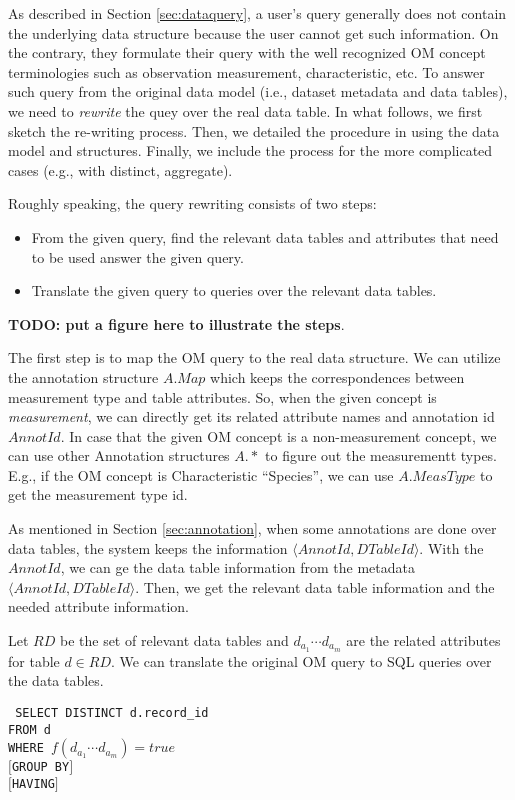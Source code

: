 \documentclass[conference]{IEEEtran}
\begin{document}
As described in Section \ref{sec:dataquery}, 
a user's query generally does not contain the underlying data
structure because the user cannot get such information. 
On the contrary, they formulate their query with the well recognized
OM concept terminologies such as observation
measurement, characteristic, etc. 
To answer such query from the original data model (i.e., dataset
metadata and data tables), we need to {\em rewrite} the quey over the
real data table. 
In what follows, we first sketch the re-writing process. Then, we
detailed the procedure in using the data model and
structures. Finally, we include the process for the more complicated
cases (e.g., with distinct, aggregate). 

Roughly speaking, the query rewriting consists of two steps:
\begin{itemize}
\item From the given query, find the relevant data tables and
  attributes that need to be used answer the given query. 
\item Translate the given query to queries over the relevant data
  tables. 
\end{itemize}

{\bf TODO: put a figure here to illustrate the steps}. 

The first step is to map the OM query to the real data structure. 
We can utilize the annotation structure $A.Map$ which keeps the correspondences between
measurement type and table attributes. 
So, when the given concept is {\em measurement}, we can directly get
its related attribute names and annotation id $AnnotId$. 
In case that the given OM concept is a non-measurement concept, we can use
other Annotation structures $A.*$ to figure out the measurementt types. 
E.g., if the OM concept is Characteristic ``Species'', we can use
$A.MeasType$ to get the measurement type id. 

As mentioned in Section \ref{sec:annotation}, when some annotations are done over data tables, the system keeps the
information $\langle AnnotId, DTableId\rangle$. 
With the $AnnotId$, we can ge the data table information from the
metadata  $\langle AnnotId, DTableId\rangle$. 
Then, we get the relevant data table information and the needed attribute
information.

Let $RD$ be the set of relevant data tables and $d_{a_1} \cdots d_{a_m}$
are the related attributes for table $d\in RD$. We can translate the original OM query to SQL queries
over the data tables.  

{\tt 
SELECT DISTINCT d.record\_id\\
FROM d\\
WHERE $f(d_{a_1} \cdots d_{a_m}) = true$\\
$[$GROUP BY$]$\\
$[$HAVING$]$
}
\end{document}
